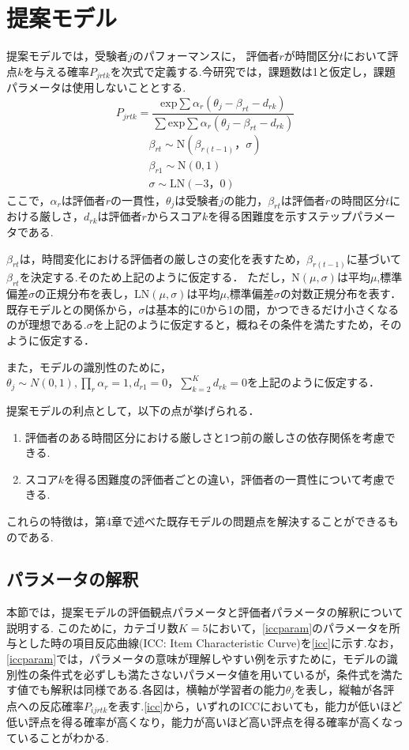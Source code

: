 \documentclass[a4paper,11pt,oneside,openany]{jsbook}
\begin{document}
\chapter{提案モデル}
提案モデルでは，受験者$j$のパフォーマンスに， 評価者$r$が時間区分$t$において評点$k$を与える確率$P_{jrtk}$を次式で定義する.今研究では，課題数は1と仮定し，課題パラメータは使用しないこととする.
\begin{displaymath}
P_{jrtk}=\frac{\mathrm{exp}\sum{\alpha_r(\theta_{j}-\beta_{rt}-d_{rk})}}{\sum \mathrm{exp}\sum{\alpha_r(\theta_{j}-\beta_{rt}-d_{rk})}}
\end{displaymath}
\begin{eqnarray}
  \beta_{rt}\sim \mathrm{N}(\beta_{r(t-1)}，\sigma)\nonumber\\
  \beta_{r1} \sim \mathrm{N}(0,1)\nonumber\\
  \sigma \sim \mathrm{LN}(-3，0)\nonumber
\end{eqnarray}
ここで，$\alpha_{r}$は評価者$r$の一貫性，$\theta_{j}$は受験者$j$の能力，$\beta_{rt}は$評価者$r$の時間区分$t$における厳しさ，$d_{rk}$は評価者$r$からスコア$k$を得る困難度を示すステップパラメータである.

$\beta_{rt}$は，時間変化における評価者の厳しさの変化を表すため，$\beta_{r(t-1)}$に基づいて$\beta_{rt}$を決定する.そのため上記のように仮定する．
ただし，$\mathrm{N}(\mu,\sigma)$は平均$\mu$,標準偏差$\sigma$の正規分布を表し，$\mathrm{LN}(\mu,\sigma)$は平均$\mu$,標準偏差$\sigma$の対数正規分布を表す．
既存モデルとの関係から，$\sigma$は基本的に0から1の間，かつできるだけ小さくなるのが理想である.$\sigma$を上記のように仮定すると，概ねその条件を満たすため，そのように仮定する．

また，モデルの識別性のために，$\theta_{j}\sim N(0,1),\prod_{r}\alpha_r=1,d_{r1}=0，\sum_{k=2}^{K}d_{rk}=0$を上記のように仮定する．

提案モデルの利点として，以下の点が挙げられる．
\begin{enumerate}
  \item 評価者のある時間区分における厳しさと1つ前の厳しさの依存関係を考慮できる.
  \item スコア$k$を得る困難度の評価者ごとの違い，評価者の一貫性について考慮できる.
\end{enumerate}
これらの特徴は，第4章で述べた既存モデルの問題点を解決することができるものである.

\section{パラメータの解釈}
本節では，提案モデルの評価観点パラメータと評価者パラメータの解釈について説明する.
このために，カテゴリ数$K=5$において，\ref{iccparam}のパラメータを所与とした時の項目反応曲線(ICC: Item Characteristic Curve)を\ref{icc}に示す.なお，\ref{iccparam}では，パラメータの意味が理解しやすい例を示すために，モデルの識別性の条件式を必ずしも満たさないパラメータ値を用いているが，条件式を満たす値でも解釈は同様である.各図は，横軸が学習者の能力$\theta_j$を表し，縦軸が各評点への反応確率$P_{ijrtk}$を表す.\ref{icc}から，いずれのICCにおいても，能力が低いほど低い評点を得る確率が高くなり，能力が高いほど高い評点を得る確率が高くなっていることがわかる.
\end{document}
